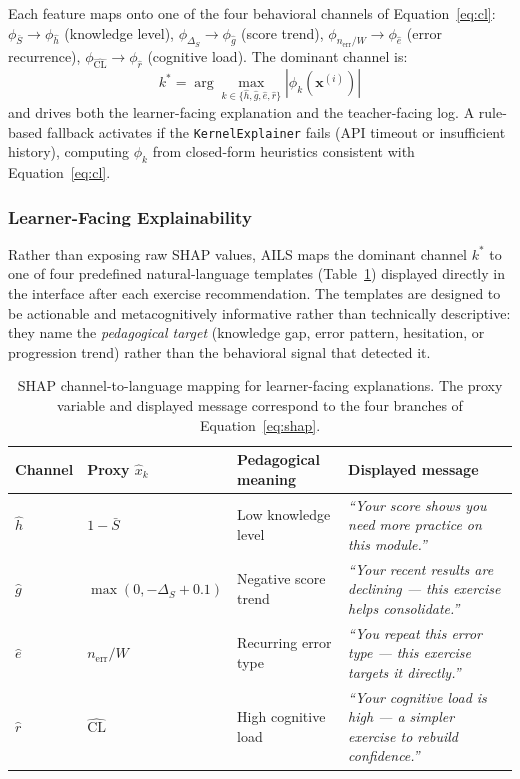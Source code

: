 \documentclass[ASNA,twocolumn]{USG} %
\begin{document}
Each feature maps onto one of the four behavioral channels of
Equation~\eqref{eq:cl}:
$\phi_{\bar{S}} \to \phi_{\hat{h}}$ (knowledge level),
$\phi_{\Delta_S} \to \phi_{\hat{g}}$ (score trend),
$\phi_{n_{\text{err}}/W} \to \phi_{\hat{e}}$ (error recurrence),
$\phi_{\widehat{\text{CL}}} \to \phi_{\hat{r}}$ (cognitive load).
The dominant channel is:
\begin{equation}
\label{eq:shap_dominant}
k^* = \arg\max_{k \in \{\hat{h},\hat{g},\hat{e},\hat{r}\}}
      |\phi_k(\mathbf{x}^{(i)})|
\end{equation}
and drives both the learner-facing explanation and the
teacher-facing log.
A rule-based fallback activates if the \texttt{KernelExplainer}
fails (API timeout or insufficient history), computing
$\phi_k$ from closed-form heuristics consistent with
Equation~\eqref{eq:cl}.

\subsubsection{Learner-Facing Explainability}

Rather than exposing raw SHAP values, AILS maps the dominant channel
$k^*$ to one of four predefined natural-language templates
(Table~\ref{tab:shap_mapping}) displayed directly in the interface
after each exercise recommendation.
The templates are designed to be actionable and metacognitively
informative rather than technically descriptive: they name the
\emph{pedagogical target} (knowledge gap, error pattern, hesitation,
or progression trend) rather than the behavioral signal that detected it.


\begin{table}[ht]
\caption{SHAP channel-to-language mapping for learner-facing
explanations. The proxy variable and displayed message correspond
to the four branches of Equation~\eqref{eq:shap}.}
\label{tab:shap_mapping}
\begin{tabularx}{\linewidth}{l l X X} %
\toprule
Channel & Proxy $\hat{x}_k$ & Pedagogical meaning & Displayed message \\
\midrule
$\hat{h}$ & $1 - \bar{S}$
  & Low knowledge level
  & \emph{``Your score shows you need more practice on this module.''} \\ \addlinespace
$\hat{g}$ & $\max(0,-\Delta_S{+}0.1)$
  & Negative score trend
  & \emph{``Your recent results are declining --- this exercise helps consolidate.''} \\ \addlinespace
$\hat{e}$ & $n_{\text{err}}/W$
  & Recurring error type
  & \emph{``You repeat this error type --- this exercise targets it directly.''} \\ \addlinespace
$\hat{r}$ & $\widehat{\text{CL}}$
  & High cognitive load
  & \emph{``Your cognitive load is high --- a simpler exercise to rebuild confidence.''} \\
\bottomrule
\end{tabularx}
\end{table}
\end{document}

